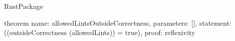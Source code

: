 \begin{lexlean}{RustPackage}
\begin{semanticmodule}
theorem{
  name: allowedLintsOutsideCorrectness,
  parameters: [],
  statement: ((outsideCorrectness (allowedLints)) = true),
  proof: reflexivity{}
}
\end{semanticmodule}
\end{lexlean}
